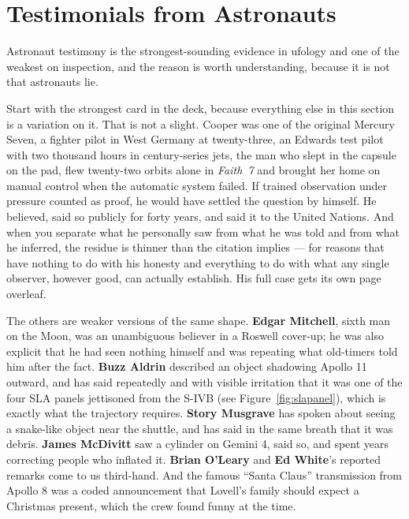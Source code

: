 \section{Testimonials from Astronauts}\label{sec:testimonialsastronauts}

Astronaut testimony is the strongest-sounding evidence in ufology and one of the weakest on
inspection, and the reason is worth understanding, because it is not that astronauts lie.

Start with the strongest card in the deck, because everything else in this section is a variation
on it.  That is not a slight. Cooper was one of the original Mercury Seven, a fighter pilot
in West Germany at twenty-three, an Edwards test pilot with two thousand hours in
century-series jets, the man who slept in the capsule on the pad, flew twenty-two orbits alone in
\emph{Faith~7} and brought her home on manual control when the automatic system failed. If
trained observation under pressure counted as proof, he would have settled the question by
himself. He believed, said so publicly for forty years, and said it to the United Nations. And
when you separate what he personally saw from what he was told and from what he inferred, the
residue is thinner than the citation implies --- for reasons that have nothing to do with his
honesty and everything to do with what any single observer, however good, can actually establish.
His full case gets its own page overleaf.

The others are weaker versions of the same shape. \textbf{Edgar Mitchell}, sixth man
on the Moon, was an unambiguous believer in a Roswell cover-up; he was also explicit that he had
seen nothing himself and was repeating what old-timers told him after the fact. \textbf{Buzz
Aldrin} described an object shadowing Apollo 11 outward, and has said repeatedly and with visible
irritation that it was one of the four SLA panels jettisoned from the S-IVB (see Figure~\ref{fig:slapanel}), which is exactly what
the trajectory requires. \textbf{Story Musgrave} has spoken about seeing a snake-like object near
the shuttle, and has said in the same breath that it was debris. \textbf{James McDivitt} saw a
cylinder on Gemini 4, said so, and spent years correcting people who inflated it. \textbf{Brian
O'Leary} and \textbf{Ed White}'s reported remarks come to us third-hand. And the famous ``Santa
Claus'' transmission from Apollo 8 was a coded announcement that Lovell's family should expect a
Christmas present, which the crew found funny at the time.

